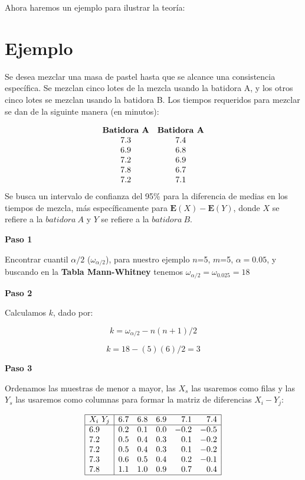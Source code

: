 \documentclass[
  a4paper,
  oneside,
  openany]{book}
\begin{document}
Ahora haremos un ejemplo para ilustrar la teoría:

\hypertarget{ejemplo-6}{%
\section{Ejemplo}\label{ejemplo-6}}

Se desea mezclar una masa de pastel hasta que se alcance una consistencia específica. Se mezclan cinco lotes de la mezcla usando la batidora A, y los otros cinco lotes se mezclan usando la batidora B. Los tiempos requeridos para mezclar se dan de la siguinte manera (en minutos):

\[
\begin{array}{c c}
\textbf{Batidora A} & \textbf{Batidora A} \\
7.3 & 7.4 \\
6.9 & 6.8  \\
7.2 & 6.9 \\
7.8 & 6.7 \\
7.2 & 7.1 \\
\end{array}
\]
Se busca un intervalo de confianza del 95\% para la diferencia de medias en los tiempos de mezcla, más específicamente para \(\mathbf{E}(X)-\mathbf{E}(Y)\), donde \(X\) se refiere a la \(batidora\ A\) y \(Y\) se refiere a la \(batidora\ B\).

\textbf{Paso 1}

Encontrar cuantil \(\alpha/2\) (\(\omega_{\alpha/2}\)), para nuestro ejemplo \(n\)=5, \(m\)=5, \(\alpha=0.05\), y buscando en la \textbf{Tabla Mann-Whitney} tenemos \(\omega_{\alpha/2}=\omega_{0.025}=18\)

\textbf{Paso 2}

Calculamos \(k\), dado por:

\[k= \omega_{\alpha/2}-n(n+1)/2\]

\[k=18-(5)(6)/2=3\]

\textbf{Paso 3}

Ordenamos las muestras de menor a mayor, las \(X_s\) las usaremos como filas y las \(Y_s\) las usaremos como columnas para formar la matriz de diferencias \(X_{i}-Y_{j}\):

\[
\begin{array}{|l| r r r r r|}
\hline
X_{i} \ Y_{j} & 6.7 & 6.8 & 6.9 & 7.1 & 7.4 \\
\hline
6.9 & 0.2 & 0.1 & 0.0 & -0.2 & -0.5 \\
7.2 & 0.5 & 0.4 & 0.3 &  0.1 & -0.2 \\
7.2 & 0.5 & 0.4 & 0.3 &  0.1 & -0.2 \\
7.3 & 0.6 & 0.5 & 0.4 &  0.2 & -0.1 \\
7.8 & 1.1 & 1.0 & 0.9 &  0.7 &  0.4 \\
\hline
\end{array}
\]
\end{document}
